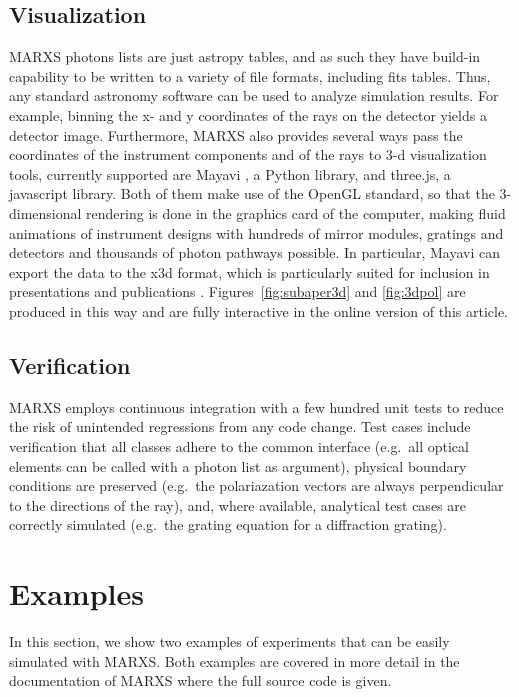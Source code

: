 \documentclass[twocolumn]{aastex61}
\begin{document}
\subsection{Visualization}
MARXS photons lists are just astropy tables, and as such they have build-in
capability to be written to a variety of file formats, including fits
tables. Thus, any standard astronomy software can be used to analyze simulation
results. For example, binning the x- and y coordinates of the rays on the
detector yields a detector image. Furthermore, MARXS also provides several ways
pass the coordinates of the instrument components and of the rays to 3-d
visualization tools, currently supported are Mayavi \citep{mayavi}, a Python
library, and three.js, a javascript library. Both of them make use of the
OpenGL standard, so that the 3-dimensional rendering is done in the graphics
card of the computer, making fluid animations of instrument designs with
hundreds of mirror modules, gratings and detectors and thousands of photon
pathways possible. In particular, Mayavi can export the data to the x3d format,
which is particularly suited for inclusion in presentations and publications
\citep{2016ApJ...818..115V}. Figures~\ref{fig:subaper3d} and \ref{fig:3dpol}
are produced in this way and are fully interactive in the online version of
this article.

\subsection{Verification}
MARXS employs continuous integration with a few hundred unit tests to reduce
the risk of unintended regressions from any code change. Test cases include
verification that all classes adhere to the common interface (e.g.\ all optical
elements can be called with a photon list as argument), physical boundary
conditions are preserved (e.g.\ the polariazation vectors are always
perpendicular to the directions of the ray), and, where available, analytical
test cases are correctly simulated (e.g.\ the grating equation for a
diffraction grating).

\section{Examples}
\label{sect:example}
In this section, we show two examples of experiments that can be easily simulated  with MARXS. Both examples are covered in more detail in the documentation of MARXS where the full source code is given.
\end{document}
